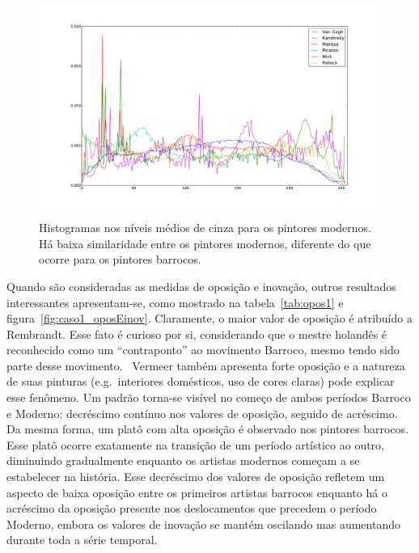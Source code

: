 \begin{figure}[h!]
    
\begin{center}
      \caption{Histogramas nos níveis médios de cinza para os pintores
        modernos. Há baixa similaridade entre os pintores modernos, diferente do
        que ocorre para os pintores barrocos.}
        \label{fig:chiaroscuro_modernos}
{    \centering
        \includegraphics[width=\columnwidth]{figs/chiaroscuro_modernos}}
      \fonteminha
  \end{center}
\end{figure}

Quando são consideradas as medidas de oposição e inovação, outros
resultados interessantes apresentam-se, como mostrado na
tabela~\ref{tab:opos1} e figura~\ref{fig:caso1_oposEinov}. Claramente,
o maior valor de oposição é atribuído a Rembrandt. Esse fato é curioso
por si, considerando que o mestre holandês é reconhecido como um
``contraponto'' ao movimento Barroco, mesmo tendo sido parte desse
movimento.~\cite{gombrich} Vermeer também apresenta forte oposição e a
natureza de suas pinturas (e.g.\ interiores domésticos, uso de cores
claras) pode explicar esse fenômeno. Um padrão torna-se visível no
começo de ambos períodos Barroco e Moderno: decréscimo contínuo nos
valores de oposição, seguido de acréscimo. Da mesma forma, um platô
com alta oposição é observado nos pintores barrocos. Esse platô ocorre
exatamente na transição de um período artístico ao outro, diminuindo
gradualmente enquanto os artistas modernos começam a se estabelecer na
história. Esse decréscimo dos valores de oposição refletem um aspecto
de baixa oposição entre os primeiros artistas barrocos enquanto há o
acréscimo da oposição presente nos deslocamentos que precedem o
período Moderno, embora os valores de inovação se mantém oscilando mas
aumentando durante toda a série temporal.

